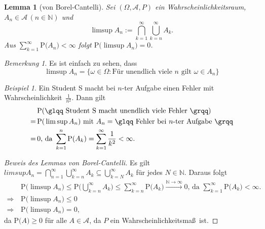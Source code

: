 \documentclass[a4paper,12pt,fleqn]{scrartcl}
\newcommand{\N}{\mathbb{N}}
\newcommand{\m}[1]{\mathcal{ #1 }}
\newcommand{\p}[1]{\text{P(} #1 \text{)}}
\newcommand{\WR}{Wahrscheinlichkeitsraum}
\newcommand{\WM}{Wahrscheinlichkeitsmaß}
\newcommand{\Wk}{Wahrscheinlichkeit}
\newcommand{\impl}{\Rightarrow}
\theoremstyle{definition}
\theoremstyle{plain}
\newtheorem*{lemma*}{Lemma}
\theoremstyle{remark}
\newtheorem*{bemerkung}{Bemerkung}
\newtheorem*{beispiel*}{Beispiel}
\begin{document}
\begin{lemma*}[von Borel-Cantelli]
Sei $(\Omega, \m{A}, P)$ ein \WR, $A_n \in \m{A} \, (n \in \N)$ und 
\[\limsup A_n := \bigcap_{k=1}^\infty \bigcup_{k=n}^\infty A_k.\]
Aus $\sum_{k=1}^\infty \p{A_n} < \infty$ folgt $\p{\limsup A_n} = 0$.
\end{lemma*}
\begin{bemerkung}
Es ist einfach zu sehen, dass
\[\limsup A_n = \{\omega \in \Omega : \text{Für unendlich viele } n \text{ gilt } \omega \in A_n\}\]
\end{bemerkung}
\begin{beispiel*}
Ein Student S macht bei $n$-ter Aufgabe einen Fehler mit \Wk \, $\frac{1}{n^2}$. Dann gilt
\begin{align*}
&\p{\text{\glqq Student S macht unendlich viele Fehler \grqq}} \\
= \, &\p{\limsup A_n} \text{ mit } A_n = \text{\glqq Fehler bei } n \text{-ter Aufgabe \grqq} \\
= \, &0 \text{, da } \sum_{k=1}^n \p{A_k} = \sum_{k=1}^\infty \frac{1}{k^2} < \infty.
\end{align*}
\end{beispiel*}
\begin{proof}[Beweis des Lemmas von Borel-Cantelli]
Es gilt $limsup A_n = \bigcap_{n=1}^\infty \bigcup_{k=n}^\infty A_k \subseteq \bigcup_{k=N}^\infty A_k$ für jedes $N \in \N$. Daraus folgt
\begin{align*}
&\p{\limsup A_n} \leq \p{\bigcup_{k=n}^\infty A_k} \leq \sum_{k=n}^\infty \p{A_k} \stackrel{\N \rightarrow \infty}{\rightarrow} 0 \text{, da } \sum_{k=1}^\infty \p{A_k} < \infty. \\
\impl \, &\p{\limsup A_n} \leq 0 \\
\impl \, &\p{\limsup A_n} = 0,
\end{align*}
da $\p{A} \geq 0$ für alle $A \in \m{A}$, da $P$ ein \WM \, ist.
\end{proof}
\end{document}
